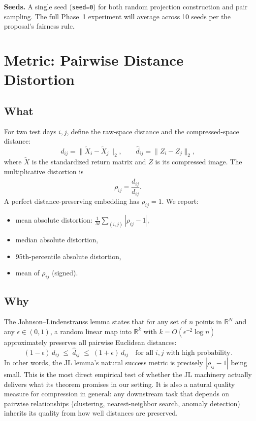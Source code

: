 \documentclass[11pt]{article}
\begin{document}
\textbf{Seeds.} A single seed (\texttt{seed=0}) for both random projection construction and pair sampling. The full Phase~1 experiment will average across 10 seeds per the proposal's fairness rule.

\section{Metric: Pairwise Distance Distortion}

\subsection{What}

For two test days $i, j$, define the raw-space distance and the compressed-space distance:
\[
d_{ij} = \|\widetilde{X}_i - \widetilde{X}_j\|_2,
\qquad
\hat{d}_{ij} = \|Z_i - Z_j\|_2,
\]
where $\widetilde{X}$ is the standardized return matrix and $Z$ is its compressed image. The multiplicative distortion is
\[
\rho_{ij} = \frac{\hat{d}_{ij}}{d_{ij}}.
\]
A perfect distance-preserving embedding has $\rho_{ij} = 1$. We report:
\begin{itemize}
    \item mean absolute distortion: $\frac{1}{M}\sum_{(i,j)} |\rho_{ij} - 1|$,
    \item median absolute distortion,
    \item 95th-percentile absolute distortion,
    \item mean of $\rho_{ij}$ (signed).
\end{itemize}

\subsection{Why}

The Johnson--Lindenstrauss lemma states that for any set of $n$ points in $\mathbb{R}^N$ and any $\epsilon \in (0, 1)$, a random linear map into $\mathbb{R}^k$ with $k = O(\epsilon^{-2} \log n)$ approximately preserves all pairwise Euclidean distances:
\[
(1 - \epsilon) \, d_{ij} \;\le\; \hat{d}_{ij} \;\le\; (1 + \epsilon) \, d_{ij}
\quad\text{for all } i, j \text{ with high probability.}
\]
In other words, the JL lemma's natural success metric is precisely $|\rho_{ij} - 1|$ being small. This is the most direct empirical test of whether the JL machinery actually delivers what its theorem promises in our setting. It is also a natural quality measure for compression in general: any downstream task that depends on pairwise relationships (clustering, nearest-neighbor search, anomaly detection) inherits its quality from how well distances are preserved.
\end{document}
